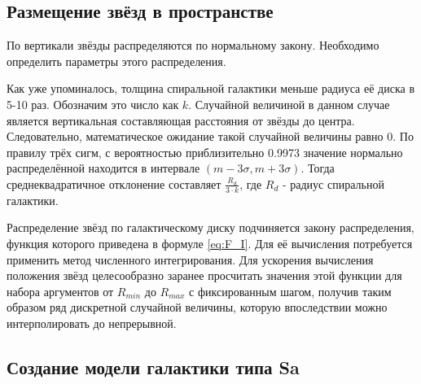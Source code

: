 \subsection{Размещение звёзд в пространстве}
По вертикали звёзды распределяются по нормальному закону. Необходимо определить параметры этого распределения.

Как уже упоминалось, толщина спиральной галактики меньше радиуса её диска в 5-10 раз. Обозначим это число как $k$. Случайной величиной в данном случае является вертикальная составляющая расстояния от звёзды до центра. Следовательно, математическое ожидание такой случайной величины равно 0. По правилу трёх сигм, с вероятностью приблизительно 0.9973 значение нормально распределённой находится в интервале $(m -3\sigma{}, m + 3\sigma{})$. Тогда среднеквадратичное отклонение составляет $\frac{R_d}{3\cdot{}k}$, где $R_d$ - радиус спиральной галактики.

Распределение звёзд по галактическому диску подчиняется закону распределения, функция которого приведена в формуле \ref{eq:F_I}. Для её вычисления потребуется применить метод численного интегрирования. Для ускорения вычисления положения звёзд целесообразно заранее просчитать значения этой функции для набора аргументов от $R_{min}$ до $R_{max}$ с фиксированным шагом, получив таким образом ряд дискретной случайной величины, которую впоследствии можно интерполировать до непрерывной.

\subsection{Создание модели галактики типа Sa}

